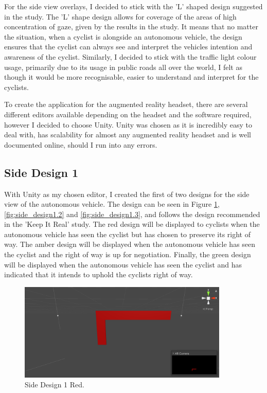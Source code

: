 \documentclass{l4proj}
\begin{document}
For the side view overlays, I decided to stick with the 'L' shaped design suggested in the study. The 'L' shape design allows for coverage of the areas of high concentration of gaze, given by the results in the study. It means that no matter the situation, when a cyclist is alongside an autonomous vehicle, the design ensures that the cyclist can always see and interpret the vehicles intention and awareness of the cyclist. Similarly, I decided to stick with the traffic light colour usage, primarily due to its usage in public roads all over the world, I felt as though it would be more recognisable, easier to understand and interpret for the cyclists.

To create the application for the augmented reality headset, there are several different editors available depending on the headset and the software required, however I decided to choose Unity. Unity was chosen as it is incredibly easy to deal with, has scalability for almost any augmented reality headset and is well documented online, should I run into any errors.

\subsection{Side Design 1}

With Unity as my chosen editor, I created the first of two designs for the side view of the autonomous vehicle. The design can be seen in Figure \ref{fig:side_design1.1}, \ref{fig:side_design1.2} and \ref{fig:side_design1.3}, and follows the design recommended in the 'Keep It Real' study. The red design will be displayed to cyclists when the autonomous vehicle has seen the cyclist but has chosen to preserve its right of way. The amber design will be displayed when the autonomous vehicle has seen the cyclist and the right of way is up for negotiation. Finally, the green design will be displayed when the autonomous vehicle has seen the cyclist and has indicated that it intends to uphold the cyclists right of way.

\begin{figure}[H]
    \centering
    \includegraphics[width=10cm]{images/side_design1.1.png}
    \caption{Side Design 1 Red.}
    \label{fig:side_design1.1}
\end{figure}
\end{document}
